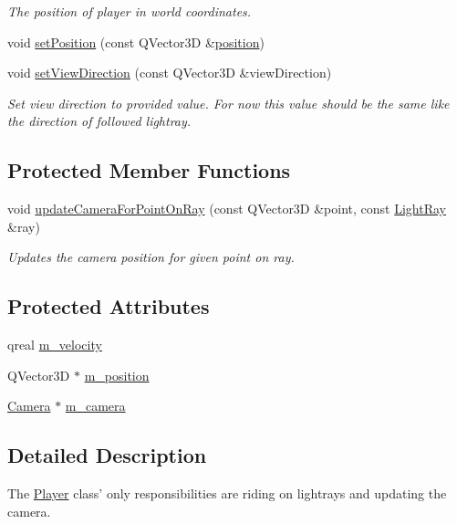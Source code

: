 \begin{DoxyCompactItemize}
\begin{DoxyCompactList}\small\item\em The position of player in world coordinates. \end{DoxyCompactList}\item 
void \hyperlink{class_player_a0cb33ddb87038b4e2af648e1b884d79f}{set\+Position} (const Q\+Vector3\+D \&\hyperlink{class_player_a0c307c67d3c6d64ee9c5b724c1e2b095}{position})
\item 
void \hyperlink{class_player_ae51ad40372e26d33351c02d77a1aba63}{set\+View\+Direction} (const Q\+Vector3\+D \&view\+Direction)
\begin{DoxyCompactList}\small\item\em Set view direction to provided value. For now this value should be the same like the direction of followed lightray. \end{DoxyCompactList}\end{DoxyCompactItemize}
\subsection*{Protected Member Functions}
\begin{DoxyCompactItemize}
\item 
void \hyperlink{class_player_a557b70acbd3cb1f71218390f7e90105c}{update\+Camera\+For\+Point\+On\+Ray} (const Q\+Vector3\+D \&point, const \hyperlink{class_light_ray}{Light\+Ray} \&ray)
\begin{DoxyCompactList}\small\item\em Updates the camera position for given point on ray. \end{DoxyCompactList}\end{DoxyCompactItemize}
\subsection*{Protected Attributes}
\begin{DoxyCompactItemize}
\item 
qreal \hyperlink{class_player_a962e97e5fd3fe1c2db4e7e2066dbe61c}{m\+\_\+velocity}
\item 
Q\+Vector3\+D $\ast$ \hyperlink{class_player_a9dc251e6a6d9a7f49c3f2ad5b64a7780}{m\+\_\+position}
\item 
\hyperlink{class_camera}{Camera} $\ast$ \hyperlink{class_player_a7721626a1c43592bfcb0c81a836f7aad}{m\+\_\+camera}
\end{DoxyCompactItemize}


\subsection{Detailed Description}
The \hyperlink{class_player}{Player} class' only responsibilities are riding on lightrays and updating the camera. 

